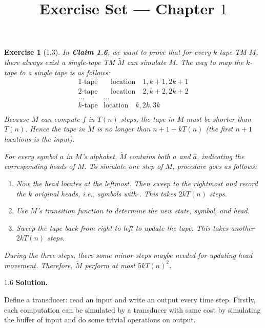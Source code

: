 \documentclass[a4paper]{article}
\title{Exercise Set --- Chapter $1$}
\date{}
\newtheorem*{exercise}{Exercise}
\begin{document}
\maketitle

\begin{exercise}[1.3]
	In \textbf{Claim 1.6}, we want to prove that for every $k$-tape TM $M$,
    there always exist a single-tape TM $\widetilde{M}$ can simulate $M$.
    The way to map the $k$-tape to a single tape is as follows:
		$$
        \begin{matrix}		
            1\text{-tape}&\quad \text{location}\quad 1, k+1, 2k+1\\			
             2\text{-tape}&\quad \text{location}\quad 2, k+2, 2k+2\\			
			 \dots&\dots\\			
             k\text{-tape}&\text{location}\quad k, 2k, 3k\\			
		\end{matrix}
        $$
	Because $M$ can compute $f$ in $T(n)$ steps, the tape in $M$ must be shorter than $T(n)$.
    Hence the tape in $\widetilde{M}$ is no longer than $n+1+kT(n)$ (the first $n+1$ locations is the input).

	For every symbol $a$ in $M$'s alphabet, $\widetilde{M}$ contains both $a$ and $\widehat{a}$, 
    indicating the corresponding heads of $M$. 
	To simulate one step of $M$, procedure goes as follows:
    \begin{enumerate}
        \item Now the head locates at the leftmost.
            Then sweep to the rightmost and record the $k$ original heads, i.e., symbols with $\widehat{ }$. 
            This takes $2kT(n)$ steps.
        \item Use $M$'s transition function to determine the new state, symbol, and head.
        \item Sweep the tape back from right to left to update the tape. 
            This takes another $2kT(n)$ steps.
    \end{enumerate}
	During the three steps, there some minor steps maybe needed for updating head movement. 
	Therefore, $\widetilde{M}$ perform at most $5kT(n)^2$. 
\end{exercise}

1.6 \textbf{Solution.}

Define a transducer: read an input and write an output every time step. Firstly, each computation can be simulated by a transducer with same cost by simulating the buffer of input and do some trivial operations on output.
\end{document}
